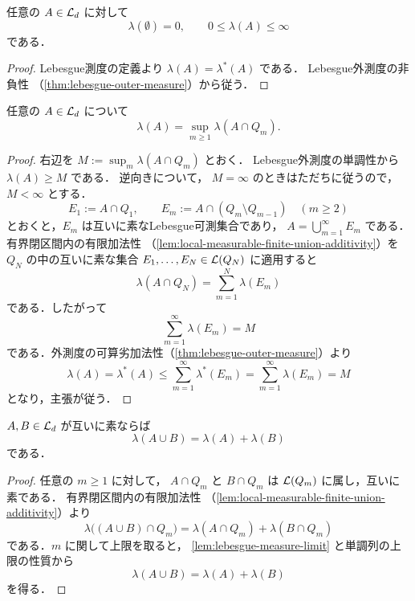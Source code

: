 \begin{proposition}[非負性]\label{prop:lebesgue-measure-nonnegative}
任意の $A\in\mathcal L_d$ に対して
\[
\lambda(\emptyset)=0, \qquad 0\le\lambda(A)\le\infty
\]
である．
\end{proposition}
\begin{proof}
Lebesgue測度の定義より $\lambda(A)=\lambda^*(A)$ である．
Lebesgue外測度の非負性
（\cref{thm:lebesgue-outer-measure}）から従う．
\end{proof}

\begin{lemma}[測度の極限表示]\label{lem:lebesgue-measure-limit}
任意の $A\in\mathcal L_d$ について
\[
\lambda(A)=\sup_{m\ge1}\lambda(A\cap Q_m).
\]
\end{lemma}
\begin{proof}
右辺を $M := \sup_m \lambda(A \cap Q_m)$ とおく．
Lebesgue外測度の単調性から $\lambda(A) \ge M$ である．
逆向きについて，
$M=\infty$ のときはただちに従うので，$M<\infty$ とする．
\[
E_1:=A\cap Q_1,\qquad
E_m:=A\cap(Q_m\setminus Q_{m-1})\quad(m\ge2)
\]
とおくと，$E_m$ は互いに素なLebesgue可測集合であり，
$A=\bigcup_{m=1}^{\infty}E_m$ である．
有界閉区間内の有限加法性
（\cref{lem:local-measurable-finite-union-additivity}）を
$Q_N$ の中の互いに素な集合 $E_1,\dots,E_N\in\mathcal L(Q_N)$ に適用すると
\[
\lambda(A\cap Q_N)=\sum_{m=1}^{N}\lambda(E_m)
\]
である．したがって
\[
\sum_{m=1}^{\infty}\lambda(E_m)=M
\]
である．外測度の可算劣加法性（\cref{thm:lebesgue-outer-measure}）より
\[
\lambda(A)=\lambda^*(A)\le
\sum_{m=1}^{\infty}\lambda^*(E_m)
=
\sum_{m=1}^{\infty}\lambda(E_m)=M
\]
となり，主張が従う．
\end{proof}

\begin{lemma}[有限加法性]\label{lem:lebesgue-measure-finite-additivity}
$A,B\in\mathcal L_d$ が互いに素ならば
\[
\lambda(A\cup B)=\lambda(A)+\lambda(B)
\]
である．
\end{lemma}
\begin{proof}
任意の $m\ge1$ に対して，
$A\cap Q_m$ と $B\cap Q_m$ は $\mathcal L(Q_m)$ に属し，互いに素である．
有界閉区間内の有限加法性
（\cref{lem:local-measurable-finite-union-additivity}）より
\[
\lambda\bigl((A\cup B)\cap Q_m\bigr)
=
\lambda(A\cap Q_m)+\lambda(B\cap Q_m)
\]
である．$m$ に関して上限を取ると，
\cref{lem:lebesgue-measure-limit} と単調列の上限の性質から
\[
\lambda(A\cup B)=\lambda(A)+\lambda(B)
\]
を得る．
\end{proof}

